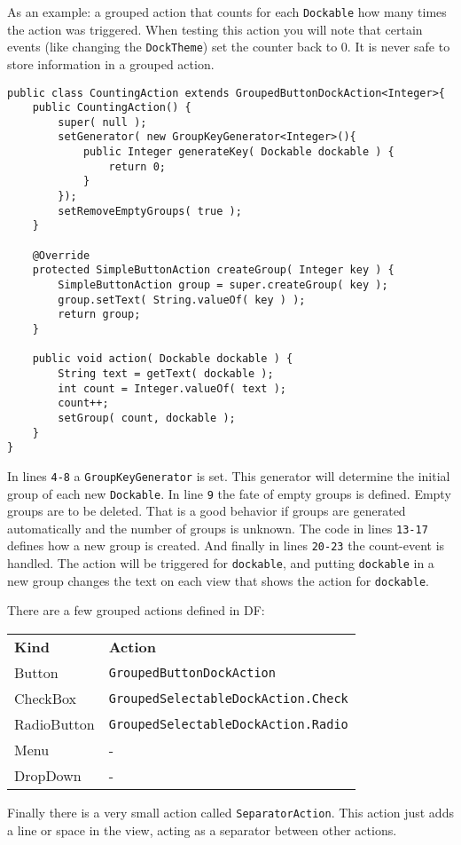 \documentclass[a4paper,10pt]{article}
\newcommand{\src}[1]{\lstinline[basicstyle=\normalsize\ttfamily,keywordstyle=\normalsize\ttfamily,identifierstyle=\normalsize\ttfamily]|#1|}
\begin{document}
As an example: a grouped action that counts for each \src{Dockable} how many times the action was triggered. When testing this action you will note that certain events (like changing the \src{DockTheme}) set the counter back to 0. It is never safe to store information in a grouped action.
\begin{lstlisting}
public class CountingAction extends GroupedButtonDockAction<Integer>{
	public CountingAction() {
		super( null );
		setGenerator( new GroupKeyGenerator<Integer>(){
			public Integer generateKey( Dockable dockable ) {
				return 0;
			}
		});
		setRemoveEmptyGroups( true );
	}

	@Override
	protected SimpleButtonAction createGroup( Integer key ) {
		SimpleButtonAction group = super.createGroup( key );
		group.setText( String.valueOf( key ) );
		return group;
	}

	public void action( Dockable dockable ) {
		String text = getText( dockable );
		int count = Integer.valueOf( text );
		count++;
		setGroup( count, dockable );
	}
}
\end{lstlisting}
In lines \src{4-8} a \src{GroupKeyGenerator} is set. This generator will determine the initial group of each new \src{Dockable}. In line \src{9} the fate of empty groups is defined. Empty groups are to be deleted. That is a good behavior if groups are generated automatically and the number of groups is unknown. The code in lines \src{13-17} defines how a new group is created. And finally in lines \src{20-23} the count-event is handled. The action will be triggered for \src{dockable}, and putting \src{dockable} in a new group changes the text on each view that shows the action for \src{dockable}.

There are a few grouped actions defined in DF:
\begin{center}
\begin{tabular}{ll}
\textbf{Kind} & \textbf{Action} \\
Button & \src{GroupedButtonDockAction} \\
CheckBox & \src{GroupedSelectableDockAction.Check} \\ 
RadioButton & \src{GroupedSelectableDockAction.Radio} \\ 
Menu & - \\
DropDown & -
\end{tabular}
\end{center}

Finally there is a very small action called \src{SeparatorAction}. This action just adds a line or space in the view, acting as a separator between other actions.
\end{document}
